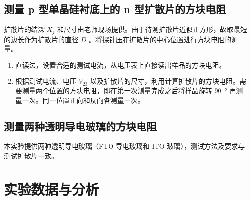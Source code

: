     \subsection{测量 p 型单晶硅衬底上的 n 型扩散片的方块电阻}
        扩散片的结深 $X_j$ 和尺寸由老师现场提供。由于待测扩散片近似正方形，故取最短的边长作为扩散片的直径 $D$ 。将探针压在扩散片的中心位置进行方块电阻的测量。
        \begin{enumerate}
            \item 直读法，设置合适的测试电流，从电压表上直接读出样品的方块电阻。
            \item 根据测试电流、电压 $V_{23}$ 以及扩散片的尺寸，利用计算扩散片的方块电阻。需要测量两个位置的方块电阻，即在第一次测量完成之后将样品旋转 \SI{90}{\degree} 再测量一次。同一位置正向和反向各测量一次。
        \end{enumerate}
    \subsection{测量两种透明导电玻璃的方块电阻}
        本实验提供两种透明导电玻璃（FTO 导电玻璃和 ITO 玻璃），测试方法及要求与测试扩散片一致。
        \pagebreak
\section{实验数据与分析}
